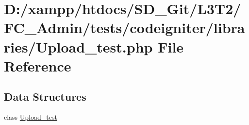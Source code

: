 \hypertarget{_admin_2tests_2codeigniter_2libraries_2_upload__test_8php}{}\section{D\+:/xampp/htdocs/\+S\+D\+\_\+\+Git/\+L3\+T2/\+F\+C\+\_\+\+Admin/tests/codeigniter/libraries/\+Upload\+\_\+test.php File Reference}
\label{_admin_2tests_2codeigniter_2libraries_2_upload__test_8php}
\subsection*{Data Structures}
\begin{DoxyCompactItemize}
\item 
class \hyperlink{class_upload__test}{Upload\+\_\+test}
\end{DoxyCompactItemize}
